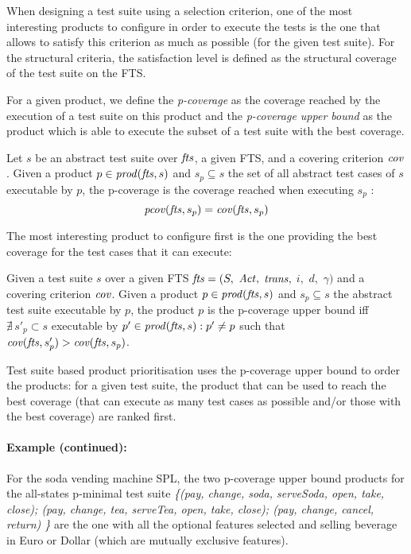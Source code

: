 \label{subsec:structuralprodselect}

When designing a test suite using a selection criterion, one of the most interesting products to configure in order to execute the tests is the one that  allows to satisfy this criterion as much as possible (for the given test suite). For the structural criteria, the satisfaction level is defined as the structural coverage of the test suite on the FTS. 

For a given product, we define the \emph{p-coverage} as the coverage reached by the execution of a test suite on this product and the \emph{p-coverage upper bound} as the product which is able to execute the subset of a test suite with the best coverage.

\begin{definition}[P-coverage]
Let $s$ be an abstract test suite over $\mathit{fts}$, a given FTS, and a covering criterion $\mathit{cov}$. Given a product $p \in \mathit{prod}(\mathit{fts},s) $ and $s_p \subseteq s$ the set of all abstract test cases of $s$ executable by $p$, the p-coverage is the coverage reached when executing $s_p$ : $$\mathit{pcov}(\mathit{fts}, s_p) = \mathit{cov}(\mathit{fts}, s_p)$$
\end{definition}
%
The most interesting product to configure first is the one providing the best coverage for the test cases that it can execute:
%
\begin{property}
Given a test suite $s$ over a given FTS $\mathit{fts} = (S,$ $\mathit{Act},$ $\mathit{trans},$ $i,$ $d,$ $\gamma) $ and a covering criterion $\mathit{cov}$. Given a product $p \in \mathit{prod}(\mathit{fts},s) $ and $s_p \subseteq s$ the abstract test suite executable by $p$, the product $p$ is the p-coverage upper bound iff $\nexists \, s'_p \subset s $ executable by $p' \in \mathit{prod}(\mathit{fts},s): p' \neq p$ such that $ \mathit{cov}(\mathit{fts},s'_p) > \mathit{cov}(\mathit{fts},s_p)$.
\end{property}

Test suite based product prioritisation uses the p-coverage upper bound to order the products: for a given test suite, the product that can be used to reach the best coverage (\ie that can execute as many test cases as possible and/or those with the best coverage) are ranked first.

\paragraph{Example (continued):} 

For the soda vending machine SPL, the two p-coverage upper bound products for the all-states p-minimal test suite \textit{\{(pay, change, soda, serve\-Soda, open, take, close); (pay, change, tea, serve\-Tea, open, take, close); (pay, change, cancel, return) \}} are the one with all the optional features selected and selling beverage in Euro or Dollar (which are mutually exclusive features).


